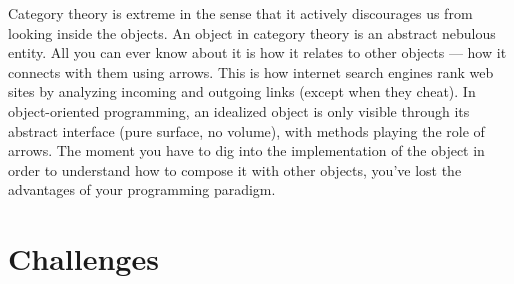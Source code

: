 Category theory is extreme in the sense that it actively discourages us
from looking inside the objects. An object in category theory is an
abstract nebulous entity. All you can ever know about it is how it
relates to other objects --- how it connects with them using arrows. This
is how internet search engines rank web sites by analyzing incoming and
outgoing links (except when they cheat). In object-oriented programming,
an idealized object is only visible through its abstract interface (pure
surface, no volume), with methods playing the role of arrows. The moment
you have to dig into the implementation of the object in order to
understand how to compose it with other objects, you've lost the
advantages of your programming paradigm.

\section{Challenges}

